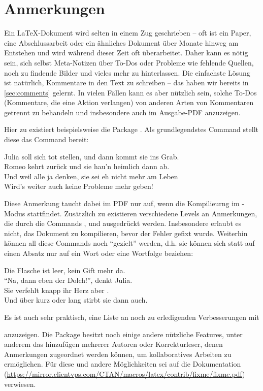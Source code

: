 \section{Anmerkungen}
Ein \LaTeX{}-Dokument wird selten in einem Zug geschrieben -- oft ist ein Paper, eine Abschlussarbeit oder ein ähnliches Dokument über Monate hinweg am Entstehen und wird während dieser Zeit oft überarbeitet.
Daher kann es nötig sein, sich selbst Meta-Notizen über To-Dos oder Probleme wie fehlende Quellen, noch zu findende Bilder und vieles mehr zu hinterlassen.
Die einfachste Lösung ist natürlich, Kommentare in den Text zu schreiben -- das haben wir bereits in \autoref{sec:comments} gelernt.
In vielen Fällen kann es aber nützlich sein, solche To-Dos (Kommentare, die eine Aktion verlangen) von anderen Arten von Kommentaren getrennt zu behandeln und insbesondere auch im Ausgabe-PDF anzuzeigen.

Hier zu existiert beispielsweise die Package .
Als grundlegendstes Command stellt diese das Command  bereit:
\begin{latexlisting}
	Julia soll sich tot stellen, und dann kommt sie ins Grab.\\
	Romeo kehrt zurück und sie hau'n heimlich dann ab.\\
	Und weil alle ja denken, sie sei eh nicht mehr am Leben\\
	Wird's weiter auch keine Probleme mehr geben!
\end{latexlisting}
Diese Anmerkung taucht dabei im PDF nur auf, wenn die Kompilieurng im -Modus stattfindet.
Zusätzlich zu  existieren verschiedene Levels an Anmerkungen, die durch die Commands ,  und  ausgedrückt werden.
Insbesondere erlaubt  es nicht, das Dokument zu kompilieren, bevor der Fehler gefixt wurde.
Weiterhin können all diese Commands noch \enquote{gezielt} werden, d.h. sie können sich statt auf einen Absatz nur auf ein Wort oder eine Wortfolge beziehen:
\begin{latexlisting}
	Die Flasche ist leer, kein Gift mehr da.\\
	\enquote{Na, dann eben der Dolch!}, denkt Julia.\\
	Sie verfehlt knapp ihr Herz aber .\\
	Und über kurz oder lang stirbt sie dann auch.
\end{latexlisting}
Es ist auch sehr praktisch, eine Liste an noch zu erledigenden Verbesserungen mit
\begin{latexlisting}
	\listoffixmes
\end{latexlisting}
anzuzeigen.
Die Package  besitzt noch einige andere nützliche Features, unter anderem das hinzufügen mehrerer Autoren oder Korrekturleser, denen Anmerkungen zugeordnet werden können, um kollaboratives Arbeiten zu ermöglichen.
Für diese und andere Möglichkeiten sei auf die Dokumentation (\url{https://mirror.clientvps.com/CTAN/macros/latex/contrib/fixme/fixme.pdf}) verwiesen.
